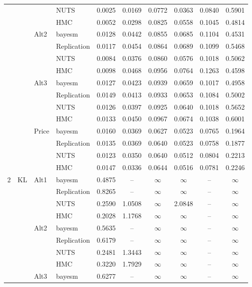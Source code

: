 \begin{longtable}{clllcccccc}
 &  &  & NUTS & 0.0025 & 0.0169 & 0.0772 & 0.0363 & 0.0840 & 0.5901 \\
 &  &  & HMC & 0.0052 & 0.0298 & 0.0825 & 0.0558 & 0.1045 & 0.4814 \\
 &  & Alt2 & bayesm & 0.0128 & 0.0442 & 0.0855 & 0.0685 & 0.1104 & 0.4531 \\
 &  &  & Replication & 0.0117 & 0.0454 & 0.0864 & 0.0689 & 0.1099 & 0.5468 \\
 &  &  & NUTS & 0.0084 & 0.0376 & 0.0860 & 0.0576 & 0.1018 & 0.5062 \\
 &  &  & HMC & 0.0098 & 0.0468 & 0.0956 & 0.0764 & 0.1263 & 0.4598 \\
 &  & Alt3 & bayesm & 0.0127 & 0.0423 & 0.0939 & 0.0659 & 0.1017 & 0.4958 \\
 &  &  & Replication & 0.0149 & 0.0413 & 0.0933 & 0.0653 & 0.1084 & 0.5002 \\
 &  &  & NUTS & 0.0126 & 0.0397 & 0.0925 & 0.0640 & 0.1018 & 0.5652 \\
 &  &  & HMC & 0.0133 & 0.0450 & 0.0967 & 0.0674 & 0.1038 & 0.6001 \\
 &  & Price & bayesm & 0.0160 & 0.0369 & 0.0627 & 0.0523 & 0.0765 & 0.1964 \\
 &  &  & Replication & 0.0135 & 0.0369 & 0.0640 & 0.0523 & 0.0758 & 0.1877 \\
 &  &  & NUTS & 0.0123 & 0.0350 & 0.0640 & 0.0512 & 0.0804 & 0.2213 \\
 &  &  & HMC & 0.0147 & 0.0336 & 0.0644 & 0.0516 & 0.0781 & 0.2246 \\
2 & KL & Alt1 & bayesm & 0.4875 & {--} & $\infty$ & $\infty$ & {--} & $\infty$ \\
 &  &  & Replication & 0.8265 & {--} & $\infty$ & $\infty$ & {--} & $\infty$ \\
 &  &  & NUTS & 0.2590 & 1.0508 & $\infty$ & 2.0848 & {--} & $\infty$ \\
 &  &  & HMC & 0.2028 & 1.1768 & $\infty$ & $\infty$ & {--} & $\infty$ \\
 &  & Alt2 & bayesm & 0.5635 & {--} & $\infty$ & $\infty$ & {--} & $\infty$ \\
 &  &  & Replication & 0.6179 & {--} & $\infty$ & $\infty$ & {--} & $\infty$ \\
 &  &  & NUTS & 0.2481 & 1.3443 & $\infty$ & $\infty$ & {--} & $\infty$ \\
 &  &  & HMC & 0.3220 & 1.7929 & $\infty$ & $\infty$ & {--} & $\infty$ \\
 &  & Alt3 & bayesm & 0.6277 & {--} & $\infty$ & $\infty$ & {--} & $\infty$ \\

\end{longtable}
